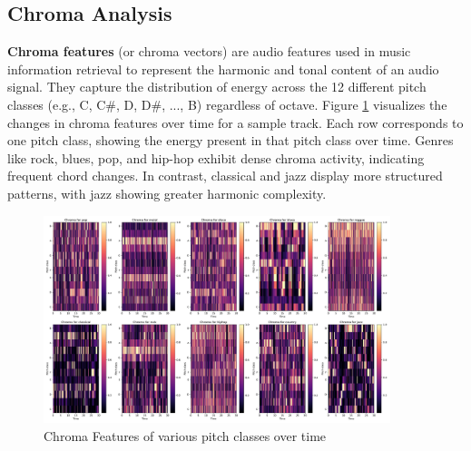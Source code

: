 \documentclass[11.5pt]{article}
\begin{document}
\subsection{Chroma Analysis}
\textbf{Chroma features} (or chroma vectors) are audio features used in music information retrieval to represent the harmonic and tonal content of an audio signal. They capture the distribution of energy across the 12 different pitch classes (e.g., C, C\#, D, D\#, ..., B) regardless of octave. Figure \ref{fig:chroma} visualizes the changes in chroma features over time for a sample track. Each row corresponds to one pitch class, showing the energy present in that pitch class over time. Genres like rock, blues, pop, and hip-hop exhibit dense chroma activity, indicating frequent chord changes. In contrast, classical and jazz display more structured patterns, with jazz showing greater harmonic complexity.
\begin{figure}[h]
    \centering
    \includegraphics[width=0.9\textwidth]{graphics/chroma.pdf}
    \caption{Chroma Features of various pitch classes over time}
    \label{fig:chroma}
\end{figure}
\end{document}
